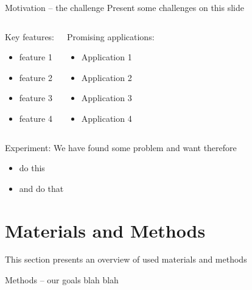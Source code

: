   \begin{frame}{Motivation – the challenge}
               {Present some challenges on this slide}
    \vspace{-3mm}
    \begin{columns}
        \begin{block}{Key features:}
          \begin{itemize}
            \item feature 1
            \item feature 2
            \item feature 3
            \item feature 4
          \end{itemize}
        \end{block}
        \begin{block}{Promising applications:}
          \begin{itemize}
            \item Application 1
            \item Application 2
            \item Application 3
            \item Application 4
          \end{itemize}
        \end{block}
    \end{columns}
    \pause
    \begin{center}
      \begin{minipage}{0.8\textwidth}
        \begin{alertblock}{Experiment:}
          We have found some problem and want therefore
          \begin{itemize}
            \item do this
            \item and do that
          \end{itemize}
        \end{alertblock}
      \end{minipage}
    \end{center}
  \end{frame}






\section{Materials and Methods}
  This section presents an overview of used materials and methods
  \begin{frame}{Methods – our goals}
     blah blah
  \end{frame}

